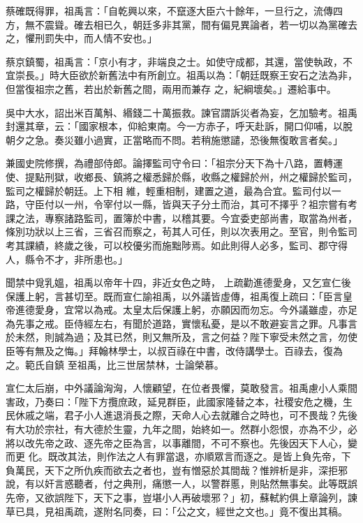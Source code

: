 \begin{pinyinscope}
 蔡確既得罪，祖禹言：「自乾興以來，不竄逐大臣六十餘年，一旦行之，流傳四方，無不震聳。確去相已久，朝廷多非其黨，間有偏見異論者，若一切以為黨確去之，懼刑罰失中，而人情不安也。」



 蔡京鎮蜀，祖禹言：「京小有才，非端良之士。如使守成都，其還，當使執政，不宜崇長。」時大臣欲於新舊法中有所創立。祖禹以為：「朝廷既察王安石之法為非，但當復祖宗之舊，若出於新舊之間，兩用而兼存
 之，紀綱壞矣。」遷給事中。



 吳中大水，詔出米百萬斛、緡錢二十萬振救。諫官謂訴災者為妄，乞加驗考。祖禹封還其章，云：「國家根本，仰給東南。今一方赤子，呼天赴訴，開口仰哺，以脫朝夕之急。奏災雖小過實，正當略而不問。若稍施懲譴，恐後無復敢言者矣。」



 兼國史院修撰，為禮部侍郎。論擇監司守令曰：「祖宗分天下為十八路，置轉運使、提點刑獄，收鄉長、鎮將之權悉歸於縣，收縣之權歸於州，州之權歸於監司，監司之權歸於朝廷。上下相
 維，輕重相制，建置之道，最為合宜。監司付以一路，守臣付以一州，令宰付以一縣，皆與天子分土而治，其可不擇乎？祖宗嘗有考課之法，專察諸路監司，置簿於中書，以稽其要。今宜委吏部尚書，取當為州者，條別功狀以上三省，三省召而察之，茍其人可任，則以次表用之。至官，則令監司考其課績，終歲之後，可以校優劣而施黜陟焉。如此則得人必多，監司、郡守得人，縣令不才，非所患也。」



 聞禁中覓乳媼，祖禹以帝年十四，非近女色之時，
 上疏勸進德愛身，又乞宣仁後保護上躬，言甚切至。既而宣仁諭祖禹，以外議皆虛傳，祖禹復上疏曰：「臣言皇帝進德愛身，宜常以為戒。太皇太后保護上躬，亦願因而勿忘。今外議雖虛，亦足為先事之戒。臣侍經左右，有聞於道路，實懷私憂，是以不敢避妄言之罪。凡事言於未然，則誠為過；及其已然，則又無所及，言之何益？陛下寧受未然之言，勿使臣等有無及之悔。」拜翰林學士，以叔百祿在中書，改侍講學士。百祿去，復為之。範氏自鎮
 至祖禹，比三世居禁林，士論榮慕。



 宣仁太后崩，中外議論洶洶，人懷顧望，在位者畏懼，莫敢發言。祖禹慮小人乘間害政，乃奏曰：「陛下方攬庶政，延見群臣，此國家隆替之本，社稷安危之機，生民休戚之端，君子小人進退消長之際，天命人心去就離合之時也，可不畏哉？先後有大功於宗社，有大德於生靈，九年之間，始終如一。然群小怨恨，亦為不少，必將以改先帝之政、逐先帝之臣為言，以事離間，不可不察也。先後因天下人心，變而更
 化。既改其法，則作法之人有罪當退，亦順眾言而逐之。是皆上負先帝，下負萬民，天下之所仇疾而欲去之者也，豈有憎惡於其間哉？惟辨析是非，深拒邪說，有以奸言惑聽者，付之典刑，痛懲一人，以警群慝，則貼然無事矣。此等既誤先帝，又欲誤陛下，天下之事，豈堪小人再破壞邪？」初，蘇軾約俱上章論列，諫草已具，見祖禹疏，遂附名同奏，曰：「公之文，經世之文也。」竟不復出其稿。




\end{pinyinscope}
